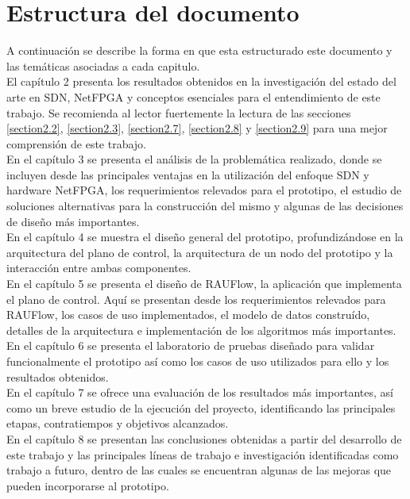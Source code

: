 \section{Estructura del documento}

A continuación se describe la forma en que esta estructurado este documento y las temáticas asociadas a cada capitulo.\\

El cap\'itulo 2 presenta los resultados obtenidos en la investigación del estado del arte en SDN, NetFPGA y conceptos esenciales para el entendimiento de este trabajo. Se recomienda al lector fuertemente la lectura de las secciones \ref{section2.2}, \ref{section2.3}, \ref{section2.7}, \ref{section2.8} y \ref{section2.9} para una mejor comprensión de este trabajo.\\

En el cap\'itulo 3 se presenta el análisis de la problemática realizado, donde se incluyen desde las principales ventajas en la utilización del enfoque SDN y hardware NetFPGA, los requerimientos relevados para el prototipo, el estudio de soluciones alternativas para la construcción del mismo y algunas de las decisiones de diseño m\'as importantes.\\

En el cap\'itulo 4 se muestra el diseño general del prototipo, profundizándose en la arquitectura del plano de control, la arquitectura de un nodo del prototipo y la interacción entre ambas componentes.\\

En el cap\'itulo 5 se presenta el diseño de RAUFlow, la aplicaci\'on que implementa el plano de control. Aquí se presentan desde los requerimientos relevados para RAUFlow, los casos de uso implementados, el modelo de datos constru\'ido, detalles de la arquitectura e implementaci\'on de los algoritmos m\'as importantes.\\

En el cap\'itulo 6 se presenta el laboratorio de pruebas diseñado para validar funcionalmente el prototipo as\'i como los casos de uso utilizados para ello y los resultados obtenidos.\\

En el cap\'itulo 7 se ofrece una evaluación de los resultados m\'as importantes, así como un breve estudio de la ejecuci\'on del proyecto, identificando las principales etapas, contratiempos y objetivos alcanzados.\\

En el cap\'itulo 8 se presentan las conclusiones obtenidas a partir del desarrollo de este trabajo y las principales l\'ineas de trabajo e investigaci\'on identificadas como trabajo a futuro, dentro de las cuales se encuentran algunas de las mejoras que pueden incorporarse al prototipo.\\

